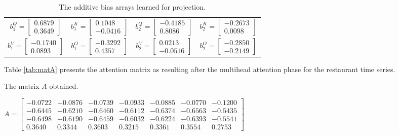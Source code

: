 \documentclass[algorithms,article,submit,pdftex,moreauthors]{Definitions/mdpi}
\begin{document}
\begin{table}
	\centering
	\caption{The additive bias arrays learned for projection.}
	\label{tab:bias}
	\begin{tabular}{c c c c}
		$b^{Q}_1 = \begin{bmatrix} 0.6879 \\ 0.3649 \end{bmatrix}$ 
		& $b^{K}_1 = \begin{bmatrix} 0.1048 \\ -0.0416 \end{bmatrix}$ 
		& $b^{Q}_2 = \begin{bmatrix}-0.4185 \\ 0.8086 \end{bmatrix}$ 
		& $b^{K}_2 = \begin{bmatrix} -0.2673 \\  0.0098 \end{bmatrix}$ \\
		$b^{V}_1 = \begin{bmatrix} -0.1740 \\  0.0893 \end{bmatrix}$ 
		& $b^{O}_1 = \begin{bmatrix} -0.3292 \\  0.4357 \end{bmatrix}$ 
		& $b^{V}_2 = \begin{bmatrix} 0.0213 \\ -0.0516 \end{bmatrix}$ 
		& $b^{O}_2 = \begin{bmatrix} -0.2850 \\ -0.2149 \end{bmatrix}$ \\
	\end{tabular}
\end{table}

\noindent Table \ref{tab:matA} presents the attention matrix as resulting after the multihead attention phase for the restaurant time series.

\begin{table}[ht]
	\centering
	\caption{The matrix $A$ obtained.}
	\label{tab:matA}
	$
	A = \begin{bmatrix}
		-0.0722 & -0.0876 & -0.0739 & -0.0933 & -0.0885 & -0.0770 & -0.1200 \\
		-0.6445 & -0.6210 & -0.6460 & -0.6112 & -0.6374 & -0.6563 & -0.5435 \\
		-0.6498 & -0.6190 & -0.6459 & -0.6032 & -0.6224 & -0.6393 & -0.5541 \\
		0.3640 &  0.3344 &  0.3603 &  0.3215 &  0.3361 &  0.3554 &  0.2753
	\end{bmatrix}
	$
\end{table}
\end{document}
